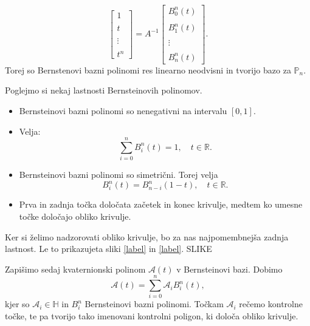 \documentclass[mat1]{fmfdelo}
\newcommand{\R}{\mathbb R}
\newcommand{\HH}{\mathbb H}
\newcommand{\A}{\mathcal A}
\newcommand{\B}{\mathcal B}
\begin{document}
\begin{dokaz}
\begin{equation*}
\begin{bmatrix}
		1 \\   \\  t \\ \\ \vdots \\ \\ t^n
		\end{bmatrix}
		= A^{-1}
		\begin{bmatrix}
		B_0^n(t) \\ \\B_1^n(t) \\ \\ \vdots \\ \\ B_n^n(t)
		\end{bmatrix}.		
	\end{equation*}
	Torej so Bernstenovi bazni polinomi res linearno neodvisni in tvorijo bazo za $\mathbb{P}_n$.
\end{dokaz}
Poglejmo si nekaj lastnosti Bernsteinovih polinomov.
\begin{itemize}
	\item Bernsteinovi bazni polinomi so nenegativni na intervalu $\left[0,1\right]$.
	\item Velja:
	\begin{equation*}
		\sum_{i=0}^n B_i^n(t) = 1, \quad t\in \R.
	\end{equation*}
	\item Bernsteinovi bazni polinomi so simetrični. Torej velja
	\begin{equation*}
		B_i^n(t) = B_{n-i}^n(1-t), \quad t\in\R.
	\end{equation*}
	\item Prva in zadnja točka določata začetek in konec krivulje, medtem ko umesne točke določajo obliko krivulje.
\end{itemize}
Ker si želimo nadzorovati obliko krivulje, bo za nas najpomembnejša zadnja lastnost. Le to prikazujeta sliki \ref{label} in \ref{label}.
SLIKE

Zapišimo sedaj kvaternionski polinom $\A(t)$ v Bernsteinovi bazi. Dobimo
\begin{equation*}
\A(t) = \sum_{i=0}^n \A_i B_i^n(t),
\end{equation*}
kjer so $\A_i \in \HH$ in $B_i^n$ Bernsteinovi bazni polinomi. Točkam $\A_i$ rečemo kontrolne točke, te pa tvorijo tako imenovani kontrolni poligon, ki določa obliko krivulje.
\end{document}
